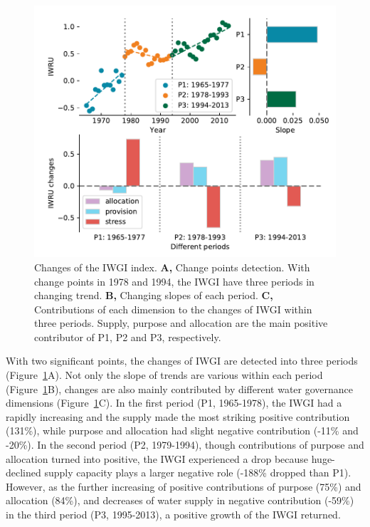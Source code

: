 \documentclass[9pt, twocolumn, twoside, lineno]{pnas-new}
\begin{document}
\begin{figure}[ht!]
	\centering
	\includegraphics[width=\linewidth]{../../figures/main/index.pdf}
	\caption{Changes of the IWGI index. 
	\textbf{A,} Change points detection. With change points in 1978 and 1994, the IWGI have three periods in changing trend.
	\textbf{B,} Changing slopes of each period.
	\textbf{C,} Contributions of each dimension to the changes of IWGI within three periods. Supply, purpose and allocation are the main positive contributor of P1, P2 and P3, respectively.
	}
	\label{fig:IWGI}
\end{figure}

With two significant points, the changes of IWGI are detected into three periods (Figure~\ref{fig:IWGI}A). 
Not only the slope of trends are various within each period (Figure~\ref{fig:IWGI}B), changes are also mainly contributed by different water governance dimensions (Figure~\ref{fig:IWGI}C).
In the first period (P1, 1965-1978), the IWGI had a rapidly increasing and the supply made the most striking positive contribution (131\%), while purpose and allocation had slight negative contribution (-11\% and -20\%).
In the second period (P2, 1979-1994), though contributions of purpose and allocation turned into positive, the IWGI experienced a drop because huge-declined supply capacity plays a larger negative role (-188\% dropped than P1). 
However, as the further increasing of positive contributions of purpose (75\%) and allocation (84\%), and decreases of water supply in negative contribution (-59\%) in the third period (P3, 1995-2013), a positive growth of the IWGI returned.
\end{document}

